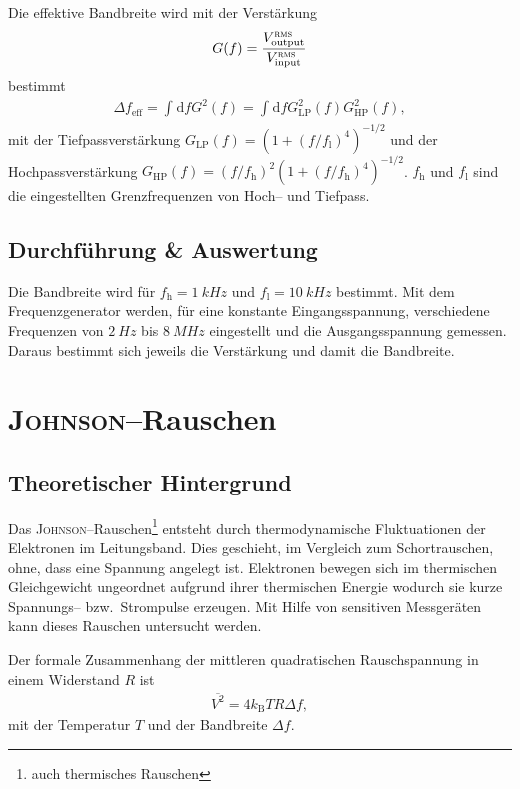 \documentclass[sn-mathphys-num,iicol]{sn-jnl}
\theoremstyle{thmstyleone}
\theoremstyle{thmstyletwo}
\theoremstyle{thmstylethree}
\newcommand{\td}{\text{d}}
\begin{document}
Die effektive Bandbreite wird mit der Verstärkung 
\begin{align} 
        G(f)=\dfrac{V^\textsc{rms}_\text{output}}{V^\textsc{rms}_\text{input}}
\end{align}
bestimmt
\begin{align} 
        \Delta f_\text{eff}=\int_{}^{}\td fG^2(f)=\int_{}^{}\td fG_\text{LP}^2(f)G_\text{HP}^2(f)
,\end{align} 
mit der Tiefpassverstärkung $G_\text{LP}(f)=\left(1+(f/f_\text{l})^4\right)^{-1/2}$ und der Hochpassverstärkung $G_\text{HP}\left(f\right)=\left(f/f_\text{h}\right)^2\left(1+(f/f_\text{h})^4\right)^{-1/2}$.
$f_\text{h}$ und $f_\text{l}$ sind die eingestellten Grenzfrequenzen von Hoch-- und Tiefpass.

\subsection{Durchführung \& Auswertung}
Die Bandbreite wird für $f_\text{h}=\SI{1}{kHz}$ und $f_\text{l}=\SI{10}{kHz}$ bestimmt.
Mit dem Frequenzgenerator werden, für eine konstante Eingangsspannung, verschiedene Frequenzen von $\SI{2}{Hz}$ bis $\SI{8}{MHz}$ eingestellt und die Ausgangsspannung gemessen.
Daraus bestimmt sich jeweils die Verstärkung und damit die Bandbreite.

\section{\textsc{Johnson}--Rauschen}
\subsection{Theoretischer Hintergrund}
Das \textsc{Johnson}--Rauschen\footnote{auch thermisches Rauschen} entsteht durch thermodynamische Fluktuationen der Elektronen im Leitungsband. 
Dies geschieht, im Vergleich zum Schortrauschen, ohne, dass eine Spannung angelegt ist.
Elektronen bewegen sich im thermischen Gleichgewicht ungeordnet aufgrund ihrer thermischen Energie wodurch sie kurze Spannungs-- bzw.\ Strompulse erzeugen.
Mit Hilfe von sensitiven Messgeräten kann dieses Rauschen untersucht werden.

Der formale Zusammenhang der mittleren quadratischen Rauschspannung in einem Widerstand $R$ ist
\begin{align} 
        \overline{V^2}=4k_\text{B}TR\Delta f
,\end{align} 
mit der Temperatur $T$ und der Bandbreite $\Delta f$.  
\end{document}
